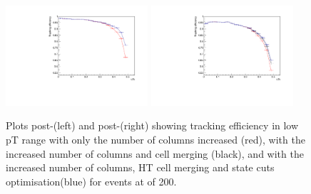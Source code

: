 \begin{figure}[tbp]
\centering
\includegraphics[width=0.47\textwidth]{figs/tk-upgrade/results-lowPtTracking/htTrackingEffVsInvPtFlatGeometry_5000.pdf}
\includegraphics[width=0.47\textwidth]{figs/tk-upgrade/results-lowPtTracking/kfTrackingEffVsInvPtFlatGeometry_5000.pdf}
\caption{Plots post-\HT (left) and post-\KF (right) showing tracking efficiency in low pT range with only the number of \qpt columns increased (red), with the increased number of \qpt columns and \HT cell merging (black), and with the increased number of columns, HT cell merging and \KF state cuts optimisation(blue) for \ttbar events at \PU of 200. }
\label{fig:2GeVFlatEff}	
\end{figure}


